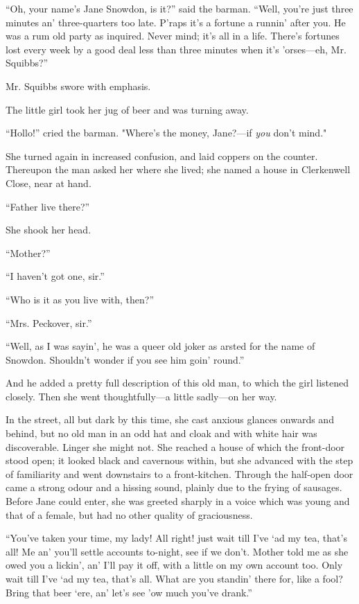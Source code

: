 ``Oh, your name's Jane Snowdon, is it?'' said the barman. ``Well, you're
just three minutes an' three-quarters too late. P'raps it's a fortune a
runnin' after you. He was a rum old party as inquired. Never mind; it's
all in a life. There's fortunes lost every week by a good deal less than
three minutes when it's 'orses---eh, Mr. Squibbs?''

Mr. Squibbs swore with emphasis.

The little girl took her jug of beer and was turning away.

``Hollo!'' cried the barman. "Where's the money, Jane?---if \emph{you}
don't mind."

{}She turned again in increased confusion, and laid coppers on the
counter. Thereupon the man asked her where she lived; she named a house
in Clerkenwell Close, near at hand.

``Father live there?''

She shook her head.

``Mother?''

``I haven't got one, sir.''

``Who is it as you live with, then?''

``Mrs. Peckover, sir.''

``Well, as I was sayin', he was a queer old joker as arsted for the name
of Snowdon. Shouldn't wonder if you see him goin' round.''

And he added a pretty full description of this old man, to which the
girl listened closely. Then she went thoughtfully---a little sadly---on
her way.

In the street, all but dark by this time, she cast anxious glances
onwards and behind, but no old man in an odd hat and cloak and with
white hair was discoverable. Linger she might not. She reached a house
of which the front-door stood open; it looked {}black and cavernous
within, but she advanced with the step of familiarity and went
downstairs to a front-kitchen. Through the half-open door came a strong
odour and a hissing sound, plainly due to the frying of sausages. Before
Jane could enter, she was greeted sharply in a voice which was young and
that of a female, but had no other quality of graciousness.

``You've taken your time, my lady! All right! just wait till I've `ad my
tea, that's all! Me an' you'll settle accounts to-night, see if we
don't. Mother told me as she owed you a lickin', an' I'll pay it off,
with a little on my own account too. Only wait till I've `ad my tea,
that's all. What are you standin' there for, like a fool? Bring that
beer `ere, an' let's see 'ow much you've drank.''

